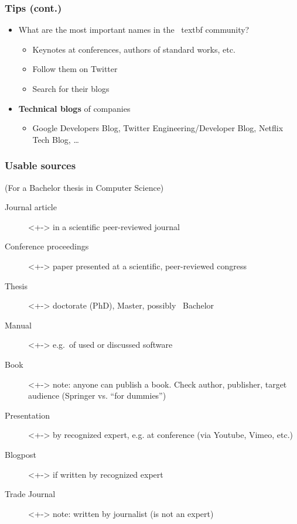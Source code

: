 \documentclass[aspectratio=169]{beamer}
\begin{document}
\begin{frame}
\frametitle{Tips (cont.)}

\begin{itemize}
    \item<+-> What are the most important names in the \ textbf {community}?
    \begin{itemize}
      \item Keynotes at conferences, authors of standard works, etc.
      \item Follow them on Twitter
      \item Search for their blogs
    \end{itemize}
    \item<+-> \textbf{Technical blogs} of companies
    \begin{itemize}
      \item Google Developers Blog, Twitter Engineering/Developer Blog, Netflix Tech Blog, \dots
    \end{itemize}
  \end{itemize}
\end{frame}


\begin{frame}
  \frametitle{Usable sources}
  
  (For a Bachelor thesis in Computer Science)
  
  \begin{description}
    \item[Journal article]<+-> in a scientific peer-reviewed journal
    \item[Conference proceedings]<+-> paper presented at a scientific, peer-reviewed congress
    \item[Thesis]<+-> doctorate (PhD), Master, possibly ~Bachelor
    \item[Manual]<+-> e.g.~of used or discussed software
    \item[Book]<+-> note: anyone can publish a book. Check author, publisher, target audience (Springer vs. ``for dummies'')
    \item[Presentation]<+-> by recognized expert, e.g. at conference (via Youtube, Vimeo, etc.)
    \item[Blogpost]<+-> if written by recognized expert
    \item[Trade Journal]<+-> note: written by journalist (is not an expert)
  \end{description}
\end{frame}
\end{document}
